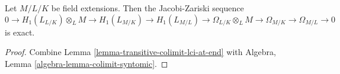 \begin{lemma}
\label{lemma-transitivity-gamma}
Let $M/L/K$ be field extensions. Then the Jacobi-Zariski
sequence
$$
0 \to H_1(L_{L/K}) \otimes_L M \to
H_1(L_{M/K}) \to
H_1(L_{M/L}) \to
\Omega_{L/K} \otimes_L M \to
\Omega_{M/K} \to
\Omega_{M/L} \to 0
$$
is exact.
\end{lemma}

\begin{proof}
Combine
Lemma \ref{lemma-transitive-colimit-lci-at-end}
with
Algebra, Lemma \ref{algebra-lemma-colimit-syntomic}.
\end{proof}
